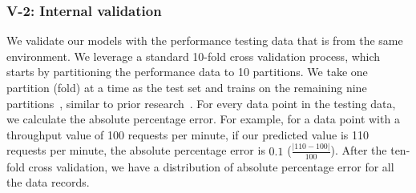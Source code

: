 
\subsubsection{V-2: Internal validation}

We validate our models with the performance testing data that is from the same environment. We leverage a standard 10-fold cross validation process, which starts by partitioning the performance data to 10 partitions. We take one partition (fold) at a time as the test set and trains on the remaining nine partitions~\cite{10foldcross,kohavi1995study}, similar to prior research~\cite{haroon}. For every data point in the testing data, we calculate the absolute percentage error. For example, for a data point with a throughput value of 100 requests per minute, if our predicted value is 110 requests per minute, the absolute percentage error is $0.1$ ($\frac{|110-100|}{100}$). After the ten-fold cross validation, we have a distribution of absolute percentage error for all the data records.



